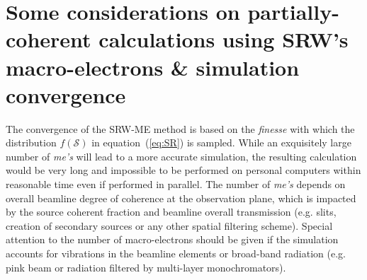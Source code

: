\documentclass{iucr}              %
\begin{document}

\section{Some considerations on partially-coherent calculations using SRW's macro-electrons \& simulation convergence}
\label{appendix:srw}

The convergence of the SRW-ME method is based on the \textit{finesse} with which the distribution $f(\mathcal{S})$ in equation~(\ref{eq:SR}) is sampled. While an exquisitely large number of \textit{me's} will lead to a more accurate simulation, the resulting calculation would be very long and impossible to be performed on personal computers within reasonable time even if performed in parallel. The number of \textit{me's} depends on overall beamline degree of coherence at the observation plane, which is impacted by the source coherent fraction and beamline overall transmission (e.g. slits, creation of secondary sources or any other spatial filtering scheme). Special attention to the number of macro-electrons should be given if the simulation accounts for vibrations in the beamline elements or broad-band radiation (e.g. pink beam or radiation filtered by multi-layer monochromators).
\end{document}
